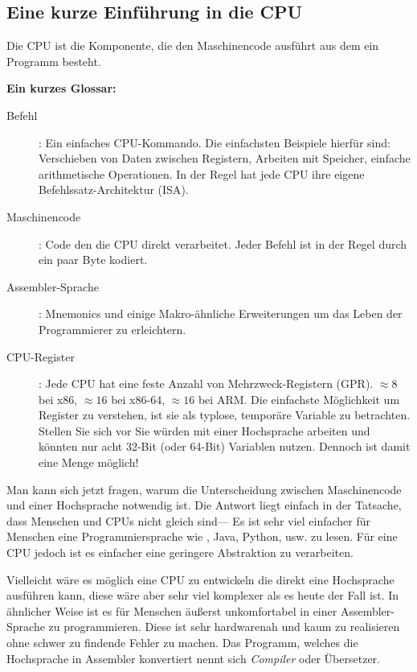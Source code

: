 \subsection{Eine kurze Einführung in die CPU}

Die \ac{CPU} ist die Komponente, die den Maschinencode ausführt aus dem ein Programm besteht.

\textbf{Ein kurzes Glossar:}

\begin{description}
\item[Befehl]: Ein einfaches \ac{CPU}-Kommando.
Die einfachsten Beispiele hierfür sind: Verschieben von Daten zwischen Registern, Arbeiten mit Speicher,
einfache arithmetische Operationen.
In der Regel hat jede \ac{CPU} ihre eigene Befehlssatz-Architektur (\ac{ISA}).

\item[Maschinencode]: Code den die \ac{CPU} direkt verarbeitet. 
Jeder Befehl ist in der Regel durch ein paar Byte kodiert.
\item[Assembler-Sprache]: Mnemonics und einige Makro-ähnliche Erweiterungen um das Leben der Programmierer zu erleichtern.
\item[CPU-Register]: Jede \ac{CPU} hat eine feste Anzahl von Mehrzweck-Registern (\ac{GPR}).
$\approx 8$ bei x86, $\approx 16$ bei x86-64, $\approx 16$ bei ARM.
Die einfachste Möglichkeit um Register zu verstehen, ist sie als typlose, temporäre Variable zu betrachten.
Stellen Sie sich vor Sie würden mit einer Hochsprache arbeiten und könnten nur acht 32-Bit (oder 64-Bit) Variablen
nutzen. Dennoch ist damit eine Menge möglich!
\end{description}


Man kann sich jetzt fragen, warum die Unterscheidung zwischen Maschinencode und einer Hochsprache notwendig ist.
Die Antwort liegt einfach in der Tatsache, dass Menschen und \ac{CPU}s nicht gleich sind---%
Es ist sehr viel einfacher für Menschen eine Programmiersprache wie \CCpp, Java, Python, usw. zu lesen. Für eine \ac{CPU} jedoch
ist es einfacher eine geringere Abstraktion zu verarbeiten.

Vielleicht wäre es möglich eine \ac{CPU} zu entwickeln die direkt eine Hochsprache ausführen kann,
diese wäre aber sehr viel komplexer als es heute der Fall ist.
In ähnlicher Weise ist es für Menschen äußerst unkomfortabel in einer Assembler-Sprache zu programmieren.
Diese ist sehr hardwarenah und kaum zu realisieren ohne schwer zu findende Fehler zu machen.
Das Programm, welches die Hochsprache in Assembler konvertiert nennt sich \emph{Compiler} oder Übersetzer.

